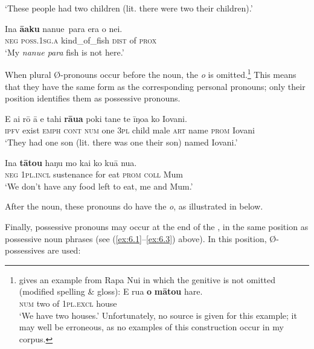\glt 
‘These people had two children (lit. there were two their children).’ \textstyleExampleref{[R481.005]} 
\z

\ea\label{ex:6.9}
\gll {\ꞌ}Ina \textbf{{\ꞌ}ā{\ꞌ}aku} nanue~para era o nei. \\
\textsc{neg} \textsc{poss.1sg.a} kind\_of\_fish \textsc{dist} of \textsc{prox} \\

\glt
‘My \textit{nanue para} fish is not here.’ \textstyleExampleref{[R301.272]} 
\z

When plural Ø-pronouns occur before the noun, the \textit{o} is omitted.\footnote{\label{fn:286}\citet[106]{Wilson1985} gives an example from Rapa Nui in which the genitive  is not omitted (modified spelling \& gloss):
\ea
\gll 
E rua \textbf{o} \textbf{mātou} hare.\\
 \textsc{num} two of \textsc{1pl.excl} house\\
\glt   ‘We have two houses.’ \z
Unfortunately, no source is given for this example; it may well be erroneous, as no examples of this construction occur in my corpus.} This means that they have the same form as the corresponding personal pronouns; only their position identifies them as possessive pronouns.

\ea\label{ex:6.10}
\gll E ai rō {\ꞌ}ā e tahi \textbf{rāua} poki tane te {\ꞌ}īŋoa ko Iovani. \\
\textsc{ipfv} exist \textsc{emph} \textsc{cont} \textsc{num} one \textsc{3pl} child male \textsc{art} name \textsc{prom} Iovani \\

\glt 
‘They had one son (lit. there was one their son) named Iovani.’ \textstyleExampleref{[R238.002]} 
\z

\ea\label{ex:6.11}
\gll {\ꞌ}Ina \textbf{tātou} haŋu mo kai ko kuā nua. \\
\textsc{neg} \textsc{1pl.incl} sustenance for eat \textsc{prom} \textsc{coll} Mum \\

\glt
‘We don’t have any food left to eat, me and Mum.’ \textstyleExampleref{[R372.047]} 
\z

After the noun, these pronouns do have the \textit{o}, as illustrated in  below.

Finally, possessive pronouns may occur at the end of the , in the same position as possessive noun phrases (see (\ref{ex:6.1}–\ref{ex:6.3}) above). In this position, Ø-possessives are used:

